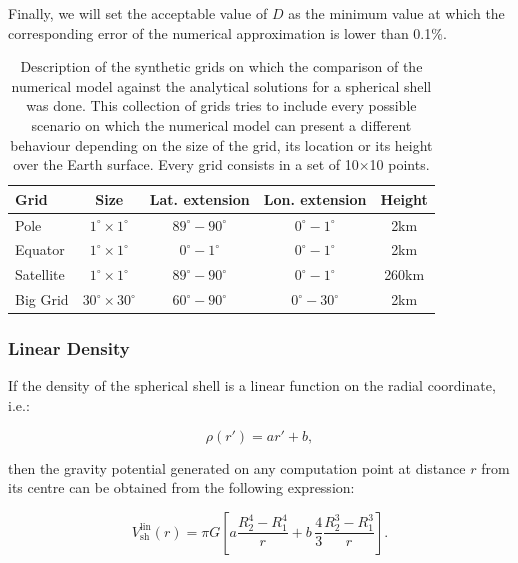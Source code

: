 \documentclass[extra]{gji}
\begin{document}
Finally, we will set the acceptable value of $D$ as the minimum value at which the
corresponding error of the numerical approximation is lower than 0.1\%.

\begin{table}
\caption{
    Description of the synthetic grids on which the comparison of the 
    numerical model against the analytical solutions for a spherical 
    shell was done.
    This collection of grids tries to include every possible scenario 
    on which the numerical model can present a different behaviour 
    depending on the size of the grid, its location or its height over 
    the Earth surface. Every grid consists in a set of 10$\times$10 
    points.
}
\label{tab:grids}
\begin{tabular}{lcccc}
    Grid & Size & Lat. extension & Lon. extension & Height \\ \hline
    Pole & $1^\circ \times 1^\circ$ & $89^\circ - 90^\circ$ &
        $0^\circ - 1^\circ$ & 2km \\
    Equator & $1^\circ \times 1^\circ$ & $0^\circ - 1^\circ$ &
        $0^\circ - 1^\circ$ & 2km \\
    Satellite & $1^\circ \times 1^\circ$ & $89^\circ - 90^\circ$ &
        $0^\circ - 1^\circ$ & 260km \\
    Big Grid & $30^\circ \times 30^\circ$ & $60^\circ - 90^\circ$ &
        $0^\circ - 30^\circ$ & 2km \\
\end{tabular}
\end{table}



\subsubsection{Linear Density}

If the density of the spherical shell is a linear function on the radial coordinate, i.e.:

\begin{equation}
    \rho(r') = ar' + b,
\end{equation}

\noindent then the gravity potential generated on any computation point at distance $r$ from its centre can be obtained from the following expression:

\begin{equation}
    V_\text{sh}^\text{lin}(r) = \pi G \left[ 
    a \frac{R_2^4 - R_1^4}{r} +
    b \,\frac{4}{3} \frac{R_2^3 - R_1^3}{r} \right].
    \label{eq:shell-pot-linear}
\end{equation}
\end{document}
